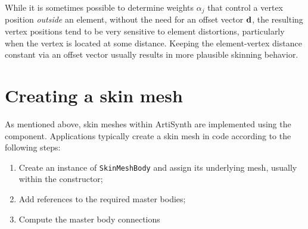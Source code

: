 \begin{sideblock}
While it is sometimes possible to determine weights $\alpha_j$ that
control a vertex position {\it outside} an element, without the need
for an offset vector ${\bf d}$, the resulting vertex positions tend to be
very sensitive to element distortions, particularly when the vertex is
located at some distance. Keeping the element-vertex distance constant
via an offset vector usually results in more plausible skinning
behavior.
\end{sideblock}

\section{Creating a skin mesh}
\label{creatingSkinnedMesh:sec}

As mentioned above, skin meshes within ArtiSynth are implemented
using the 
component. Applications typically create a skin mesh in code
according to the following steps:

\begin{enumerate}

\item Create an instance of {\tt SkinMeshBody} and assign
its underlying mesh, usually within the constructor;

\item Add references to the required master bodies;

\item Compute the master body connections

\end{enumerate}

